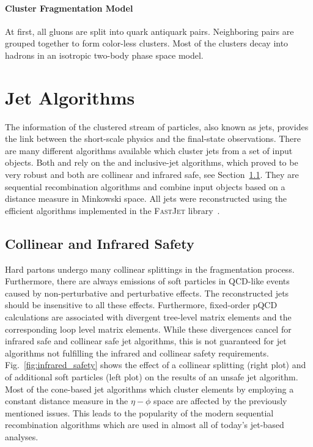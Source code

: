\paragraph{Cluster Fragmentation Model}

At first, all gluons are split into quark antiquark pairs. Neighboring pairs are
grouped together to form color-less clusters. Most of the clusters decay into
hadrons in an isotropic two-body phase space model.

\section{Jet Algorithms}
\label{sec:jet_algorithms}

The information of the clustered stream of particles, also known as jets,
provides the link between the short-scale physics and the final-state
observations. There are many different algorithms available which cluster jets
from a set of input objects. Both \CMS and \ATLAS rely on the \antikt and
inclusive-\kt jet algorithms, which proved to be very robust and both are
collinear and infrared safe, see Section~\ref{sec:coll_safety}. They are
sequential recombination algorithms and combine input objects based on a
distance measure in Minkowski space. All jets were reconstructed using the
efficient algorithms implemented in the \textsc{FastJet} library~\cite{Cacciari:2011ma}.

\subsection{Collinear and Infrared Safety}
\label{sec:coll_safety}

Hard partons undergo many collinear splittings in the fragmentation process.
Furthermore, there are always emissions of soft particles in QCD-like events
caused by non-perturbative and perturbative effects. The reconstructed jets
should be insensitive to all these effects. Furthermore, fixed-order pQCD
calculations are associated with divergent tree-level matrix elements and the
corresponding loop level matrix elements. While these divergences cancel for
infrared safe and collinear safe jet algorithms, this is not guaranteed for jet
algorithms not fulfilling the infrared and collinear safety
requirements.
Fig.~\ref{fig:infrared_safety} shows the effect of a collinear splitting (right
plot) and of additional soft particles (left plot) on the results of an unsafe
jet algorithm. Most of the cone-based jet algorithms which cluster elements
by employing a constant distance measure in the $\eta-\phi$ space are affected by the
previously mentioned issues. This leads to the popularity of the modern sequential
recombination algorithms which are used in almost all of today's jet-based
analyses.

